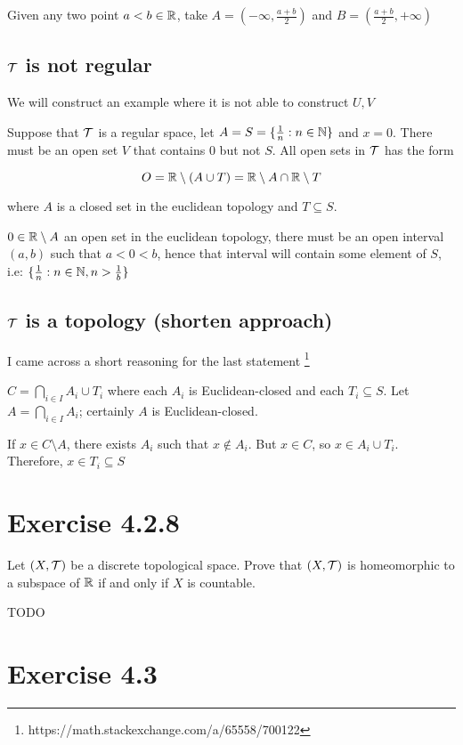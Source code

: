 \documentclass{article}
\begin{document}
Given any two point $a < b \in \mathbb{R}$, take $A = (-\infty, \frac{a+b}{2})$ and $B = (\frac{a+b}{2}, +\infty)$

\subsection*{$\mathcal{T}$ is not regular}

We will construct an example where it is not able to construct $U, V$

Suppose that $\mathcal{T}$ is a regular space, let $A = S = \{ \frac{1}{n}: n \in \mathbb{N}\}$ and $x = 0$. There must be an open set $V$ that contains $0$ but not $S$. All open sets in $\mathcal{T}$ has the form

$$
    O = \mathbb{R} \setminus (A \cup T) = \mathbb{R} \setminus A \cap \mathbb{R} \setminus T
$$

where $A$ is a closed set in the euclidean topology and $T \subseteq S$.

$0 \in \mathbb{R} \setminus A$ an open set in the euclidean topology, there must be an open interval $(a, b)$ such that $a < 0 < b$, hence that interval will contain some element of $S$, i.e: $\{ \frac{1}{n}: n \in \mathbb{N}, n > \frac{1}{b} \}$

\subsection*{$\mathcal{T}$ is a topology (shorten approach)}

I came across a short reasoning for the last statement \footnote{https://math.stackexchange.com/a/65558/700122} 

$C = \bigcap_{i \in I} A_i \cup T_i$ where each $A_i$ is Euclidean-closed and each $T_i \subseteq S$. Let $A = \bigcap_{i \in I} A_i$; certainly $A$ is Euclidean-closed.

If $x \in C \setminus A$, there exists $A_i$ such that $x \notin A_i$. But $x \in C$, so $x \in A_i \cup T_i$. Therefore, $x \in T_i \subseteq S$

\section*{Exercise 4.2.8}
Let $(X, \mathcal{T})$ be a discrete topological space. Prove that $(X, \mathcal{T})$ is homeomorphic
to a subspace of $\mathbb{R}$ if and only if $X$ is countable.

TODO

\section*{Exercise 4.3}
\end{document}
